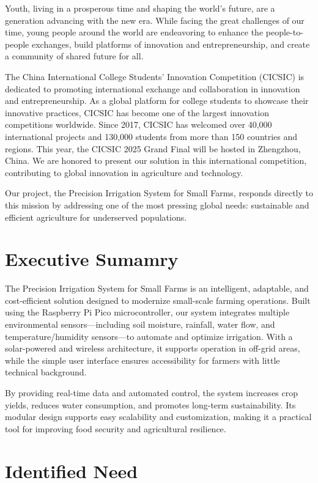 \documentclass{IEEEtran}
\begin{document}
Youth, living in a prosperous time and shaping the world’s future, are a generation advancing with the new era. While facing the great challenges of our time, young people around the world are endeavoring to enhance the people-to-people exchanges, build platforms of innovation and entrepreneurship, and create a community of shared future for all.

The China International College Students’ Innovation Competition (CICSIC) is dedicated to promoting international exchange and collaboration in innovation and entrepreneurship. As a global platform for college students to showcase their innovative practices, CICSIC has become one of the largest innovation competitions worldwide. Since 2017, CICSIC has welcomed over 40,000 international projects and 130,000 students from more than 150 countries and regions. This year, the CICSIC 2025 Grand Final will be hosted in Zhengzhou, China. We are honored to present our solution in this international competition, contributing to global innovation in agriculture and technology.

Our project, the Precision Irrigation System for Small Farms, responds directly to this mission by addressing one of the most pressing global needs: sustainable and efficient agriculture for underserved populations.

\section{Executive Sumamry}

The Precision Irrigation System for Small Farms is an intelligent, adaptable, and cost-efficient solution designed to modernize small-scale farming operations. Built using the Raspberry Pi Pico microcontroller, our system integrates multiple environmental sensors—including soil moisture, rainfall, water flow, and temperature/humidity sensors—to automate and optimize irrigation. With a solar-powered and wireless architecture, it supports operation in off-grid areas, while the simple user interface ensures accessibility for farmers with little technical background.

By providing real-time data and automated control, the system increases crop yields, reduces water consumption, and promotes long-term sustainability. Its modular design supports easy scalability and customization, making it a practical tool for improving food security and agricultural resilience.

\section{Identified Need}
\end{document}
